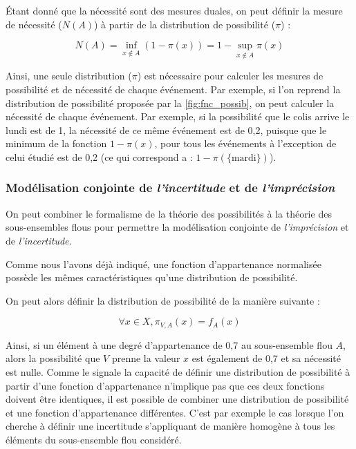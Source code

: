 Étant donné que la nécessité sont des mesures duales, on peut définir
la mesure de nécessité (\(N(A)\)) à partir de la distribution de
possibilité (\(π\)) :

\begin{equation}
  N(A) = \inf_{x ∉ A}(1-π(x)) = 1 - \sup_{x ∉ A}π(x)
\end{equation}

Ainsi, une seule distribution (\(\pi\)) est nécessaire pour calculer
les mesures de possibilité et de nécessité de chaque événement. Par
exemple, si l'on reprend la distribution de possibilité proposée par
la \autoref{fig:fnc_possib}, on peut calculer la nécessité de chaque
événement. Par exemple, si la possibilité que le colis arrive le lundi
est de 1, la nécessité de ce même événement est de 0,2, puisque que le
minimum de la fonction \(1-π(x)\), pour tous les événements à
l'exception de celui étudié est de 0,2 (ce qui correspond a :
\(1-π(\{\text{mardi}\})\)).

\subsubsection{Modélisation conjointe de \emph{l'incertitude} et de
  \emph{l'imprécision}}

On peut combiner le formalisme de la théorie des possibilités à la
théorie des sous-ensembles flous pour permettre la modélisation
conjointe de \emph{l'imprécision} et de \emph{l'incertitude.}

Comme nous l'avons déjà indiqué, une fonction d'appartenance
normalisée possède les mêmes caractéristiques qu'une distribution de
possibilité.

On peut alors définir la distribution de possibilité de la manière
suivante :

\begin{equation}
  \forall x \in X, \pi_{V, A}(x)=f_A(x)
\end{equation}

Ainsi, si un élément à une degré d'appartenance de 0,7 au
sous-ensemble flou \(A\), alors la possibilité que \(V\) prenne la
valeur \(x\) est également de 0,7 et sa nécessité est nulle.
%
Comme le signale \textcite{Bouchon-Meunier1995} la capacité de définir
une distribution de possibilité à partir d'une fonction d'appartenance
n'implique pas que ces deux fonctions doivent être identiques, il est
possible de combiner une distribution de possibilité et une fonction
d'appartenance différentes.
%
C'est par exemple le cas lorsque l'on cherche à définir une
incertitude s'appliquant de manière homogène à tous les éléments du
sous-ensemble flou considéré.

